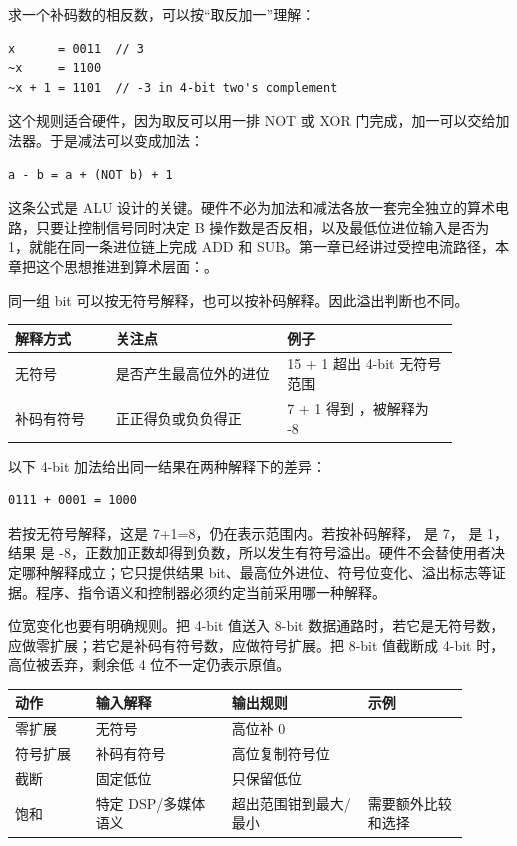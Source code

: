 求一个补码数的相反数，可以按“取反加一”理解：

\begin{lstlisting}
x      = 0011  // 3
~x     = 1100
~x + 1 = 1101  // -3 in 4-bit two's complement
\end{lstlisting}

这个规则适合硬件，因为取反可以用一排 NOT 或 XOR 门完成，加一可以交给加法器。于是减法可以变成加法：

\begin{lstlisting}
a - b = a + (NOT b) + 1
\end{lstlisting}

这条公式是 ALU 设计的关键。硬件不必为加法和减法各放一套完全独立的算术电路，只要让控制信号同时决定 B 操作数是否反相，以及最低位进位输入是否为 1，就能在同一条进位链上完成 ADD 和 SUB。第一章已经讲过受控电流路径，本章把这个思想推进到算术层面：。

同一组 bit 可以按无符号解释，也可以按补码解释。因此溢出判断也不同。

\begin{longtable}{L{0.2\linewidth}L{0.34\linewidth}L{0.34\linewidth}}
\toprule
解释方式 & 关注点 & 例子 \\
\midrule
无符号 & 是否产生最高位外的进位 & 15 + 1 超出 4-bit 无符号范围 \\
补码有符号 & 正正得负或负负得正 & 7 + 1 得到 ，被解释为 -8 \\
\bottomrule
\end{longtable}

以下 4-bit 加法给出同一结果在两种解释下的差异：

\begin{lstlisting}
0111 + 0001 = 1000
\end{lstlisting}

若按无符号解释，这是 7+1=8，仍在表示范围内。若按补码解释， 是 7， 是 1，结果  是 -8，正数加正数却得到负数，所以发生有符号溢出。硬件不会替使用者决定哪种解释成立；它只提供结果 bit、最高位外进位、符号位变化、溢出标志等证据。程序、指令语义和控制器必须约定当前采用哪一种解释。

位宽变化也要有明确规则。把 4-bit 值送入 8-bit 数据通路时，若它是无符号数，应做零扩展；若它是补码有符号数，应做符号扩展。把 8-bit 值截断成 4-bit 时，高位被丢弃，剩余低 4 位不一定仍表示原值。

\begin{longtable}{L{0.16\linewidth}L{0.27\linewidth}L{0.27\linewidth}L{0.2\linewidth}}
\toprule
动作 & 输入解释 & 输出规则 & 示例 \\
\midrule
零扩展 & 无符号 & 高位补 0 &  \\
符号扩展 & 补码有符号 & 高位复制符号位 &  \\
截断 & 固定低位 & 只保留低位 &  \\
饱和 & 特定 DSP/多媒体语义 & 超出范围钳到最大/最小 & 需要额外比较和选择 \\
\bottomrule
\end{longtable}

